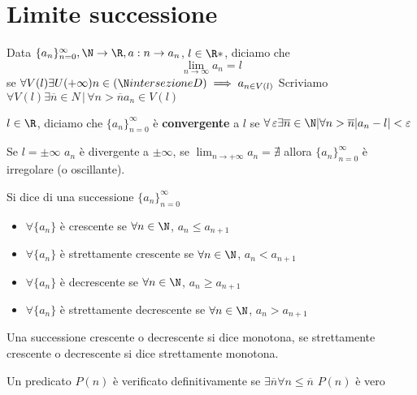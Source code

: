 \section{Limite successione}

Data $ \{a_{n} \}_{n=0}^\infty, \N \to \R, a: n\to a_{n}  $, $l \in \R*$, diciamo che 
\[
    \lim_{n\to\infty}a_{n}=l  
\]
se $\forall V(l) \exists U(+\infty) n \in(\N intersezione D) \implies a_{n \in V(l)}$
Scriviamo $\forall V(l) \exists \overline{n} \in N \,|\, \forall n>\overline{n} a_{n} \in V(l)$

$l\in \R$, diciamo che $ \{a_{n} \}_{n=0}^\infty $ è \textbf{convergente} a $ l $ se $ \forall\, \varepsilon \exists \overline{n} \in \N | \forall n>\overline{n} |a_{n} -l |<\varepsilon  $

Se $ l=\pm \infty $ $a_{n}$ è divergente a $ \pm\infty $, se $ \lim_{n\to+\infty} a_{n}=\nexists $ allora $ \{a_{n}\}_{n=0 }^\infty$ è irregolare (o oscillante).



Si dice di una successione $\{a_{n} \}_{n=0}^\infty$

\begin{itemize}
    \item $\forall \{a_{n} \}$ è crescente se $ \forall n \in \N $, $ a_{n} \le a_{n+1}  $
    \item $\forall\{a_{n} \}$ è strettamente crescente se $ \forall n \in \N $, $ a_{n} < a_{n+1}  $
    \item $\forall\{a_{n} \}$ è decrescente se $ \forall n \in \N $, $ a_{n} \ge a_{n+1}  $
    \item $\forall \{a_{n} \}$ è strettamente decrescente se $ \forall n \in \N $, $ a_{n} > a_{n+1}  $
\end{itemize}
Una successione crescente o decrescente si dice monotona, se strettamente crescente o decrescente si dice strettamente monotona.

Un predicato $ P(n) $ è verificato definitivamente se $ \exists \overline{n} \forall n\le \overline{n}$ $ P(n) $  è vero

